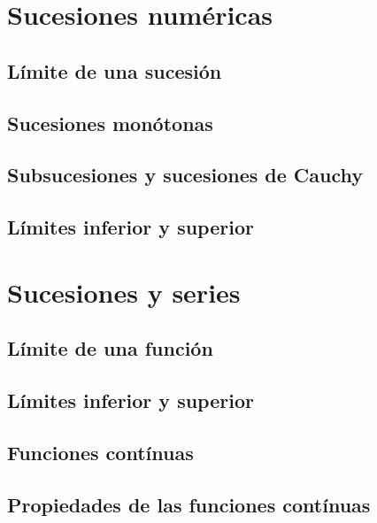 \documentclass[12pt,]{krantz}
\theoremstyle{definition}
\theoremstyle{definition}
\theoremstyle{definition}
\theoremstyle{remark}
\begin{document}
\chapter{Sucesiones numéricas}\label{sucesiones-numericas}

\section{Límite de una sucesión}\label{limite-de-una-sucesion}

\section{Sucesiones monótonas}\label{sucesiones-monotonas}

\section{Subsucesiones y sucesiones de
Cauchy}\label{subsucesiones-y-sucesiones-de-cauchy}

\section{Límites inferior y superior}\label{limites-inferior-y-superior}

\chapter{Sucesiones y series}\label{sucesiones-y-series}

\section{Límite de una función}\label{limite-de-una-funcion}

\section{Límites inferior y
superior}\label{limites-inferior-y-superior-1}

\section{Funciones contínuas}\label{funciones-continuas}

\section{Propiedades de las funciones
contínuas}\label{propiedades-de-las-funciones-continuas}
\end{document}
